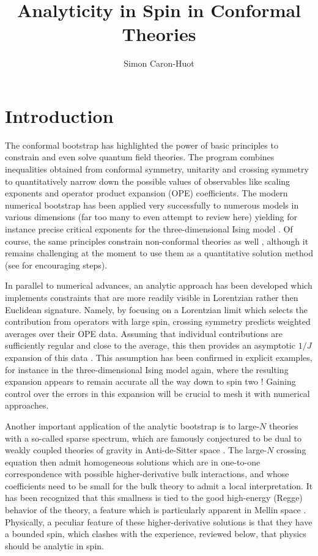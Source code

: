 \documentclass[11pt, reqno,preprint]{article}
\title{Analyticity in Spin in Conformal Theories}
\author{Simon Caron-Huot}
\affiliation[a]{Department of Physics, McGill University, 3600 rue University, Montr\'eal, QC Canada H3A 2T8}
\def\j{J}
\begin{document}
\maketitle

\section{Introduction}

The conformal bootstrap has highlighted the power of basic principles
to constrain and even solve quantum field theories.  The program combines inequalities obtained from
conformal symmetry, unitarity and crossing symmetry to quantitatively narrow down the possible
values of observables like scaling exponents and operator product expansion (OPE) coefficients.
The modern numerical bootstrap \cite{Rattazzi:2008pe} has been applied very successfully
to numerous models in various dimensions (far too many to even attempt to review here)
yielding for instance precise critical exponents for
the three-dimensional Ising model \cite{ElShowk:2012ht,El-Showk:2014dwa}.
Of course, the same principles  constrain non-conformal theories as well \cite{Adams:2006sv}, although it remains
challenging at the moment to use them as a quantitative solution method (see \cite{Paulos:2016but} for encouraging steps).

In parallel to numerical advances, an analytic approach has been developed
which implements constraints that are more readily visible in Lorentzian rather then Euclidean signature.
Namely, by focusing on a Lorentzian limit which selects the contribution from operators with large spin,
crossing symmetry predicts weighted averages over their OPE data.
Assuming that individual contributions are sufficiently regular and close to the average,
this then provides an asymptotic $1/\j$ expansion of this data
\cite{Komargodski:2012ek,Fitzpatrick:2012yx,Kaviraj:2015cxa,Kaviraj:2015xsa}.
This assumption has been confirmed in explicit examples, for instance in
the three-dimensional Ising model again, where the resulting expansion appears to remain accurate
all the way down to spin two \cite{Alday:2015ota,Simmons-Duffin:2016wlq}!
Gaining control over the errors in this expansion will be crucial to mesh it with numerical approaches.

Another important application of the analytic bootstrap is to large-$N$ theories with a so-called
sparse spectrum, which are famously conjectured to be dual to weakly coupled theories of gravity in Anti-de-Sitter space
\cite{Heemskerk:2009pn}.  The large-$N$ crossing equation then admit homogeneous solutions
which are in one-to-one correspondence with possible higher-derivative bulk interactions,
and whose coefficients need to be small for the bulk theory to admit a local interpretation.
It has been recognized that this smallness is tied to the good high-energy (Regge) behavior of the theory,
a feature which is particularly apparent in Mellin space \cite{Penedones:2010ue,Fitzpatrick:2011ia,Alday:2016htq,Rastelli:2016nze}.
Physically, a peculiar feature of these higher-derivative solutions is that they have a bounded spin,
which clashes with the experience, reviewed below, that physics should be analytic in spin.
\end{document}
